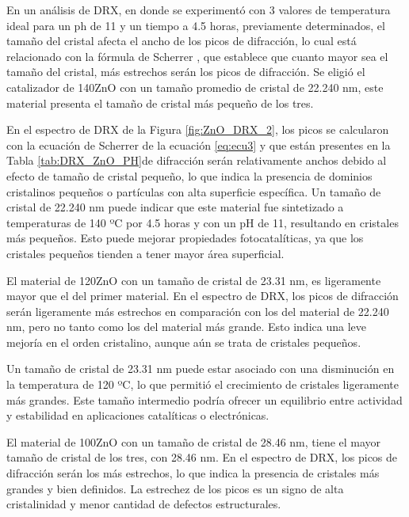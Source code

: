 \documentclass[12pt]{article}
\begin{document}
En un análisis de DRX, en donde se experimentó con 3 valores de temperatura ideal para un ph de 11 y un tiempo a 4.5 horas, previamente determinados, el tamaño del cristal afecta el ancho de los picos de difracción, lo cual está relacionado con la fórmula de Scherrer \cite{IEEEreferencias:Scherrer}, que establece que cuanto mayor sea el tamaño del cristal, más estrechos serán los picos de difracción.
Se eligió el catalizador de 140ZnO con un tamaño promedio de cristal de 22.240 nm, este material presenta el tamaño de cristal más pequeño de los tres.\vspace{1em} %

En el espectro de DRX de la Figura \ref{fig:ZnO_DRX_2}, los picos se calcularon con la ecuación de Scherrer de la ecuación \ref{eq:ecu3} y que están presentes en la Tabla \ref{tab:DRX_ZnO_PH}de difracción serán relativamente anchos debido al efecto de tamaño de cristal pequeño, lo que indica la presencia de dominios cristalinos pequeños o partículas con alta superficie específica.
Un tamaño de cristal de 22.240 nm puede indicar que este material fue sintetizado a temperaturas de 140 ºC por 4.5 horas y con un pH de 11, resultando en cristales más pequeños. Esto puede mejorar propiedades fotocatalíticas, ya que los cristales pequeños tienden a tener mayor área superficial.
\vspace{1em} %

El material de 120ZnO con un tamaño de cristal de 23.31 nm, es ligeramente mayor que el del primer material. En el espectro de DRX, los picos de difracción serán ligeramente más estrechos en comparación con los del material de 22.240 nm, pero no tanto como los del material más grande. Esto indica una leve mejoría en el orden cristalino, aunque aún se trata de cristales pequeños.\vspace{1em} %

Un tamaño de cristal de 23.31 nm puede estar asociado con una disminución en la temperatura de 120 ºC, lo que permitió el crecimiento de cristales ligeramente más grandes. Este tamaño intermedio podría ofrecer un equilibrio entre actividad y estabilidad en aplicaciones catalíticas o electrónicas.\vspace{1em} %

El material de 100ZnO con un tamaño de cristal de 28.46 nm, tiene el mayor tamaño de cristal de los tres, con 28.46 nm. En el espectro de DRX, los picos de difracción serán los más estrechos, lo que indica la presencia de cristales más grandes y bien definidos. La estrechez de los picos es un signo de alta cristalinidad y menor cantidad de defectos estructurales.\vspace{1em} %
\end{document}
